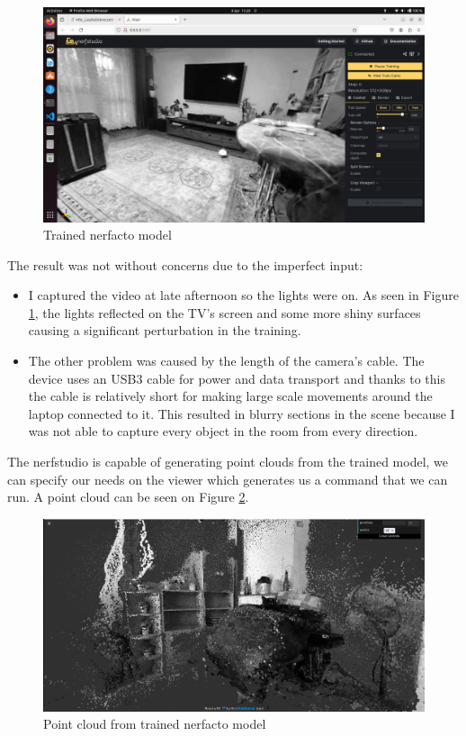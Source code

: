 \begin{figure}[H]
	\centering
	\includegraphics[width=150mm, keepaspectratio]{figures/trained_nerf_karcag1.png}
	\caption{Trained nerfacto model}
	\label{fig:trained_nerf_karcag}
\end{figure}

The result was not without concerns due to the imperfect input:
\begin{itemize}
    \item I captured the video at late afternoon so the lights were on. As seen in Figure \ref{fig:trained_nerf_karcag}, the lights reflected on the TV's screen and some more shiny surfaces causing a significant perturbation in the training.
    \item The other problem was caused by the length of the camera's cable. The device uses an USB3 cable for power and data transport and thanks to this the cable is relatively short for making large scale movements around the laptop connected to it. This resulted in blurry sections in the scene because I was not able to capture every object in the room from every direction.
\end{itemize}

The nerfstudio is capable of generating point clouds from the trained model, we can specify our needs on the viewer which generates us a command that we can run. A point cloud can be seen on Figure \ref{fig:nerfstudio_point_cloud}.

\begin{figure}[H]
	\centering
	\includegraphics[width=150mm, keepaspectratio]{figures/nerfacto_point_cloud1.png}
	\caption{Point cloud from trained nerfacto model}
	\label{fig:nerfstudio_point_cloud}
\end{figure}

